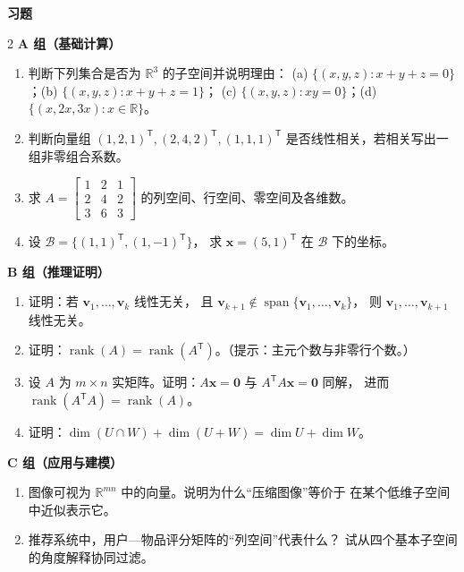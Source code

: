 \documentclass[11pt,a4paper,openany]{ctexbook}
\DeclareMathOperator{\rank}{rank}
\DeclareMathOperator{\Span}{span}
\newcommand{\R}{\mathbb{R}}
\newcommand{\Rnum}[1]{\mathbb{R}^{#1}}
\newcommand{\exhead}{%
  \par\addvspace{12pt}%
  {\noindent\sffamily\bfseries\Large\color{qing} 习题\par}%
  \vspace{-4pt}\noindent{\color{qing!32}\rule{\linewidth}{0.7pt}}\par\vspace{6pt}}
\begin{document}
\exhead
\begin{multicols}{2}
\small
\textbf{A 组（基础计算）}
\begin{enumerate}[leftmargin=1.6em, itemsep=3pt]
\item 判断下列集合是否为 $\Rnum{3}$ 的子空间并说明理由：
      (a) $\{(x,y,z):x+y+z=0\}$；(b) $\{(x,y,z):x+y+z=1\}$；
      (c) $\{(x,y,z):xy=0\}$；(d) $\{(x,2x,3x):x\in\R\}$。
\item 判断向量组 $(1,2,1)^{\mathsf T},(2,4,2)^{\mathsf T},(1,1,1)^{\mathsf T}$
      是否线性相关，若相关写出一组非零组合系数。
\item 求 $A=\begin{bmatrix}1&2&1\\ 2&4&2\\ 3&6&3\end{bmatrix}$
      的列空间、行空间、零空间及各维数。
\item 设 $\mathcal{B}=\{(1,1)^{\mathsf T},(1,-1)^{\mathsf T}\}$，
      求 $\boldsymbol{x}=(5,1)^{\mathsf T}$
      在 $\mathcal{B}$ 下的坐标。
\end{enumerate}
\textbf{B 组（推理证明）}
\begin{enumerate}[leftmargin=1.6em, itemsep=3pt, start=5]
\item 证明：若 $\boldsymbol{v}_1,\dots,\boldsymbol{v}_k$ 线性无关，
      且 $\boldsymbol{v}_{k+1}\notin\Span\{\boldsymbol{v}_1,\dots,\boldsymbol{v}_k\}$，
      则 $\boldsymbol{v}_1,\dots,\boldsymbol{v}_{k+1}$ 线性无关。
\item 证明：$\rank(A)=\rank(A^{\mathsf T})$。（提示：主元个数与非零行个数。）
\item 设 $A$ 为 $m\times n$ 实矩阵。证明：$A\boldsymbol{x}=\boldsymbol{0}$
      与 $A^{\mathsf T}A\boldsymbol{x}=\boldsymbol{0}$ 同解，
      进而 $\rank(A^{\mathsf T}A)=\rank(A)$。
\item 证明：$\dim(U\cap W)+\dim(U+W)=\dim U+\dim W$。
\end{enumerate}
\textbf{C 组（应用与建模）}
\begin{enumerate}[leftmargin=1.6em, itemsep=3pt, start=9]
\item 图像可视为 $\Rnum{mn}$ 中的向量。说明为什么“压缩图像”等价于
      在某个低维子空间中近似表示它。
\item 推荐系统中，用户—物品评分矩阵的“列空间”代表什么？
      试从四个基本子空间的角度解释协同过滤。
\end{enumerate}
\end{multicols}

\end{document}

